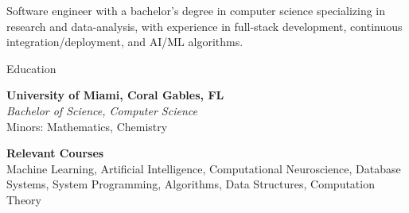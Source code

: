 \documentclass{res} %
\begin{document}
\begin{summary}{}
  Software engineer with a bachelor's degree in computer science specializing in research and data-analysis, with experience in full-stack development, continuous integration/deployment, and AI/ML algorithms.
\end{summary}

\begin{rSection}{Education}

{\bf University of Miami, Coral Gables, FL}
\\ {\em Bachelor of Science, Computer Science}
\\ Minors: Mathematics, Chemistry

{\bf Relevant Courses} \\
Machine Learning, Artificial Intelligence, Computational Neuroscience, Database Systems, System Programming, Algorithms, Data Structures, Computation Theory
\end{rSection}

\end{document}
